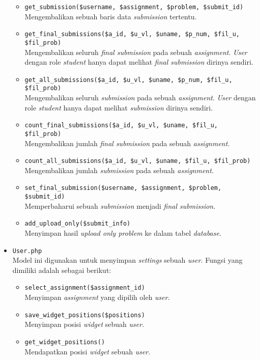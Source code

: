 \begin{itemize}
	      \begin{itemize}
		      \item \verb|get_submission($username, $assignment, $problem, $submit_id)| \\
		            Mengembalikan sebuah baris data \textit{submission} tertentu.
		      \item \verb|get_final_submissions($a_id, $u_vl, $uname, $p_num, $fil_u, $fil_prob)| \\
		            Mengembalikan seluruh \textit{final submission} pada sebuah \textit{assignment}. \textit{User} dengan role \textit{student} hanya dapat melihat \textit{final submission} dirinya sendiri.
		      \item \verb|get_all_submissions($a_id, $u_vl, $uname, $p_num, $fil_u, $fil_prob)| \\
		            Mengembalikan seluruh \textit{submission} pada sebuah \textit{assignment}. \textit{User} dengan role \textit{student} hanya dapat melihat \textit{submission} dirinya sendiri.
		      \item \verb|count_final_submissions($a_id, $u_vl, $uname, $fil_u, $fil_prob)| \\
		            Mengembalikan jumlah \textit{final submission} pada sebuah \textit{assignment}.
		      \item \verb|count_all_submissions($a_id, $u_vl, $uname, $fil_u, $fil_prob)| \\
		            Mengembalikan jumlah \textit{submission} pada sebuah \textit{assignment}.
		      \item \verb|set_final_submission($username, $assignment, $problem, $submit_id)| \\
		            Memperbaharui sebuah \textit{submission} menjadi \textit{final submission}.
		      \item \verb|add_upload_only($submit_info)| \\
		            Menyimpan hasil \textit{upload only problem} ke dalam tabel \textit{database}.
	      \end{itemize}

	\item \verb|User.php| \\
	      Model ini digunakan untuk menyimpan \textit{settings} sebuah \textit{user}. Fungsi yang dimiliki adalah sebagai berikut:

	      \begin{itemize}
		      \item \verb|select_assignment($assignment_id)| \\
		            Menyimpan \textit{assignment} yang dipilih oleh \textit{user}.
		      \item \verb|save_widget_positions($positions)| \\
		            Menyimpan posisi \textit{widget} sebuah \textit{user}.
		      \item \verb|get_widget_positions()| \\
		            Mendapatkan posisi \textit{widget} sebuah \textit{user}.
	      \end{itemize}


\end{itemize}
